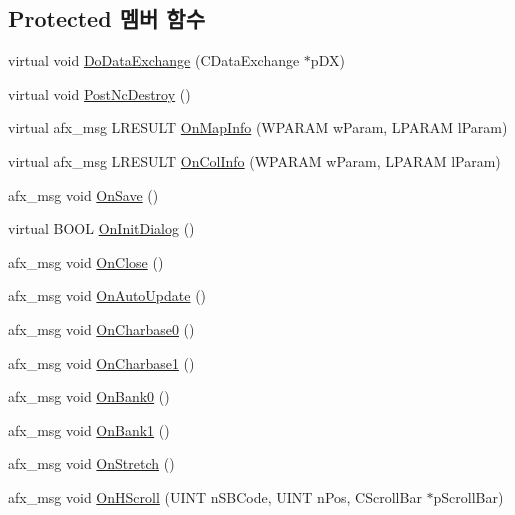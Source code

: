 \subsection*{Protected 멤버 함수}
\begin{DoxyCompactItemize}
\item 
virtual void \mbox{\hyperlink{class_g_b_tile_view_a6f6a323365040d7675c035b26fdecd9f}{Do\+Data\+Exchange}} (C\+Data\+Exchange $\ast$p\+DX)
\item 
virtual void \mbox{\hyperlink{class_g_b_tile_view_a2bc3fcd50b001a8c3ed3a592772eeb8b}{Post\+Nc\+Destroy}} ()
\item 
virtual afx\+\_\+msg L\+R\+E\+S\+U\+LT \mbox{\hyperlink{class_g_b_tile_view_a865e1fe72caf57cc6d55700bfdac0a84}{On\+Map\+Info}} (W\+P\+A\+R\+AM w\+Param, L\+P\+A\+R\+AM l\+Param)
\item 
virtual afx\+\_\+msg L\+R\+E\+S\+U\+LT \mbox{\hyperlink{class_g_b_tile_view_a6d47aa6bfc46f3d698272efb7da79dc4}{On\+Col\+Info}} (W\+P\+A\+R\+AM w\+Param, L\+P\+A\+R\+AM l\+Param)
\item 
afx\+\_\+msg void \mbox{\hyperlink{class_g_b_tile_view_a97f989bc4a5f5872258b5d8d47ae60d0}{On\+Save}} ()
\item 
virtual B\+O\+OL \mbox{\hyperlink{class_g_b_tile_view_a4d97fe7dcfd863756d993834548d2ca6}{On\+Init\+Dialog}} ()
\item 
afx\+\_\+msg void \mbox{\hyperlink{class_g_b_tile_view_a59304e229d01ff07e7e232389d19017b}{On\+Close}} ()
\item 
afx\+\_\+msg void \mbox{\hyperlink{class_g_b_tile_view_ad31fb32f27279e00c296717013144d33}{On\+Auto\+Update}} ()
\item 
afx\+\_\+msg void \mbox{\hyperlink{class_g_b_tile_view_afb45c55e706bed1468f547510490fa2a}{On\+Charbase0}} ()
\item 
afx\+\_\+msg void \mbox{\hyperlink{class_g_b_tile_view_a9d5c6de9e7d359cf221b164f51cb6a18}{On\+Charbase1}} ()
\item 
afx\+\_\+msg void \mbox{\hyperlink{class_g_b_tile_view_a35e281e40e9fd8867f04a01595f54ef2}{On\+Bank0}} ()
\item 
afx\+\_\+msg void \mbox{\hyperlink{class_g_b_tile_view_a5c1db6a1066d8e37b743ca2407652b7d}{On\+Bank1}} ()
\item 
afx\+\_\+msg void \mbox{\hyperlink{class_g_b_tile_view_a7386c9ed9651610461d4342ebd492bf9}{On\+Stretch}} ()
\item 
afx\+\_\+msg void \mbox{\hyperlink{class_g_b_tile_view_a0b2b262f47b7d6c3f53270eaf80a24a1}{On\+H\+Scroll}} (U\+I\+NT n\+S\+B\+Code, U\+I\+NT n\+Pos, C\+Scroll\+Bar $\ast$p\+Scroll\+Bar)
\end{DoxyCompactItemize}


